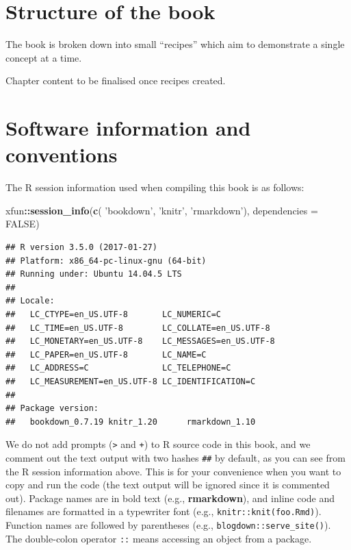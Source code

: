 \documentclass[]{book}
\newenvironment{Shaded}{\begin{snugshade}}{\end{snugshade}}
\newcommand{\KeywordTok}[1]{\textcolor[rgb]{0.13,0.29,0.53}{\textbf{#1}}}
\newcommand{\DataTypeTok}[1]{\textcolor[rgb]{0.13,0.29,0.53}{#1}}
\newcommand{\StringTok}[1]{\textcolor[rgb]{0.31,0.60,0.02}{#1}}
\newcommand{\OtherTok}[1]{\textcolor[rgb]{0.56,0.35,0.01}{#1}}
\newcommand{\OperatorTok}[1]{\textcolor[rgb]{0.81,0.36,0.00}{\textbf{#1}}}
\newcommand{\NormalTok}[1]{#1}
\begin{document}
\section*{Structure of the book}\label{structure-of-the-book}

The book is broken down into small ``recipes'' which aim to demonstrate
a single concept at a time.

Chapter content to be finalised once recipes created.

\section*{Software information and conventions}\label{software-info}

The R session information used when compiling this book is as follows:

\begin{Shaded}
\begin{Highlighting}[]
\NormalTok{xfun}\OperatorTok{::}\KeywordTok{session_info}\NormalTok{(}\KeywordTok{c}\NormalTok{(}
  \StringTok{'bookdown'}\NormalTok{, }\StringTok{'knitr'}\NormalTok{, }\StringTok{'rmarkdown'}\NormalTok{), }\DataTypeTok{dependencies =} \OtherTok{FALSE}\NormalTok{)}
\end{Highlighting}
\end{Shaded}

\begin{verbatim}
## R version 3.5.0 (2017-01-27)
## Platform: x86_64-pc-linux-gnu (64-bit)
## Running under: Ubuntu 14.04.5 LTS
## 
## Locale:
##   LC_CTYPE=en_US.UTF-8       LC_NUMERIC=C              
##   LC_TIME=en_US.UTF-8        LC_COLLATE=en_US.UTF-8    
##   LC_MONETARY=en_US.UTF-8    LC_MESSAGES=en_US.UTF-8   
##   LC_PAPER=en_US.UTF-8       LC_NAME=C                 
##   LC_ADDRESS=C               LC_TELEPHONE=C            
##   LC_MEASUREMENT=en_US.UTF-8 LC_IDENTIFICATION=C       
## 
## Package version:
##   bookdown_0.7.19 knitr_1.20      rmarkdown_1.10
\end{verbatim}

We do not add prompts (\texttt{\textgreater{}} and \texttt{+}) to R
source code in this book, and we comment out the text output with two
hashes \texttt{\#\#} by default, as you can see from the R session
information above. This is for your convenience when you want to copy
and run the code (the text output will be ignored since it is commented
out). Package names are in bold text (e.g., \textbf{rmarkdown}), and
inline code and filenames are formatted in a typewriter font (e.g.,
\texttt{knitr::knit(\textquotesingle{}foo.Rmd\textquotesingle{})}).
Function names are followed by parentheses (e.g.,
\texttt{blogdown::serve\_site()}). The double-colon operator \texttt{::}
means accessing an object from a package.
\end{document}
